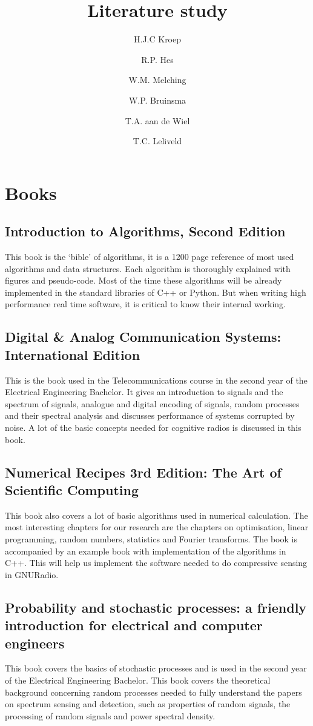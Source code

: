 \documentclass[report, oneside, a4paper, openany]{memoir}
\title{Literature study}
\author{H.J.C Kroep \and R.P. Hes \and W.M. Melching \and W.P. Bruinsma \and T.A. aan de Wiel \and T.C. Leliveld}
\begin{document}
\chapter{Books}

\section{Introduction to Algorithms, Second Edition \cite{cormen2001introduction}}
This book is the `bible' of algorithms, it is a 1200 page reference of most used algorithms and data structures. Each algorithm is thoroughly explained with figures and pseudo-code. Most of the time these algorithms will be already implemented in the standard libraries of C++ or Python. But when writing high performance real time software, it is critical to know their internal working.
\section{Digital \& Analog Communication Systems: International Edition \cite{couch2013digital}}
This is the book used in the Telecommunications course in the second year of the Electrical Engineering Bachelor. It gives an introduction to signals and the spectrum of signals, analogue and digital encoding of signals, random processes and their spectral analysis and discusses performance of systems corrupted by noise. A lot of the basic concepts needed for cognitive radios is discussed in this book. 
\section{Numerical Recipes 3rd Edition: The Art of Scientific Computing \cite{press2007numerical}}
This book also covers a lot of basic algorithms used in numerical calculation. The most interesting chapters for our research are the chapters on optimisation, linear programming, random numbers, statistics and Fourier transforms.  The book is accompanied by an example book with implementation of the algorithms in C++. This will help us implement the software needed to do compressive sensing in GNURadio.
\section{Probability and stochastic processes: a friendly introduction for electrical and computer engineers \cite{yates2005probability}}
This book covers the basics of stochastic processes and is used in the second year of the Electrical Engineering Bachelor. This book covers the theoretical background concerning random processes needed to fully understand the papers on spectrum sensing and detection, such as properties of random signals, the processing of random signals and power spectral density.
\end{document}
